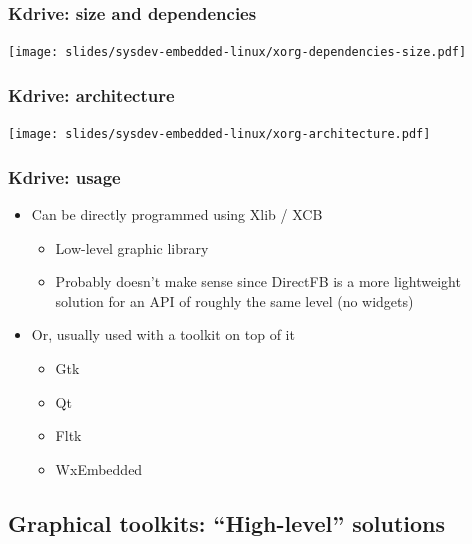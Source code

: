 \begin{frame}
  \frametitle{Kdrive: size and dependencies}
  \begin{center}
    \texttt{[image: slides/sysdev-embedded-linux/xorg-dependencies-size.pdf]}
  \end{center}
\end{frame}

\begin{frame}
  \frametitle{Kdrive: architecture}
  \begin{center}
    \texttt{[image: slides/sysdev-embedded-linux/xorg-architecture.pdf]}
  \end{center}
\end{frame}

\begin{frame}
  \frametitle{Kdrive: usage}
  \begin{itemize}
  \item Can be directly programmed using Xlib / XCB
    \begin{itemize}
    \item Low-level graphic library
    \item Probably doesn't make sense since DirectFB is a more
      lightweight solution for an API of roughly the same level (no
      widgets)
    \end{itemize}
  \item Or, usually used with a toolkit on top of it
    \begin{itemize}
    \item Gtk
    \item Qt
    \item Fltk
    \item WxEmbedded
    \end{itemize}
  \end{itemize}
\end{frame}

\subsection[High-level Toolkits]{Graphical toolkits: ``High-level''
  solutions}

